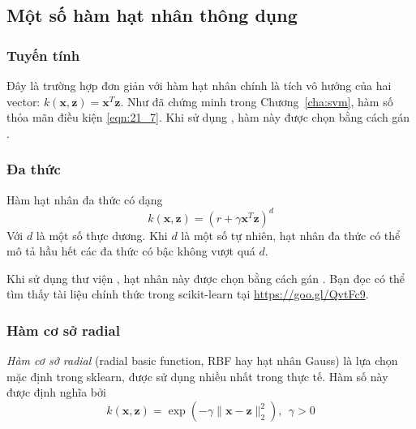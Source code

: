 \subsection{Một số hàm hạt nhân thông dụng}
\subsubsection{Tuyến tính}
Đây là trường hợp đơn giản với hàm hạt nhân chính là tích vô hướng của hai vector:
$k(\mathbf{x}, \mathbf{z}) = \mathbf{x}^T\mathbf{z}$.
Như đã chứng minh trong Chương~\ref{cha:svm}, hàm số thỏa mãn điều kiện \eqref{eqn:21_7}. Khi sử dụng , hàm này được chọn bằng cách gán
.


\subsubsection{Đa thức}
Hàm hạt nhân đa thức có dạng
\begin{equation}
k(\mathbf{x}, \mathbf{z}) = (r + \gamma \mathbf{x}^T\mathbf{z})^d
\end{equation}
Với $d$ là một số thực dương. Khi $d$ là một số tự nhiên, hạt nhân đa thức có thể mô tả hầu hết các đa thức có bậc không
vượt quá $d$.

Khi sử dụng thư viện , hạt nhân này được chọn bằng cách gán
. Bạn đọc có thể tìm thấy tài liệu
chính thức trong scikit-learn tại \url{https://goo.gl/QvtFc9}.

\subsubsection{Hàm cơ sở radial}
\textit{Hàm cơ sở radial} (radial basic function, RBF hay hạt nhân Gauss) là lựa chọn mặc định trong sklearn, được sử dụng nhiều nhất trong thực tế. Hàm số này được định nghĩa bởi
\begin{equation}
k(\mathbf{x}, \mathbf{z}) = \exp(-\gamma \|\mathbf{x} - \mathbf{z}\|_2^2), ~~ \gamma > 0
\end{equation}

